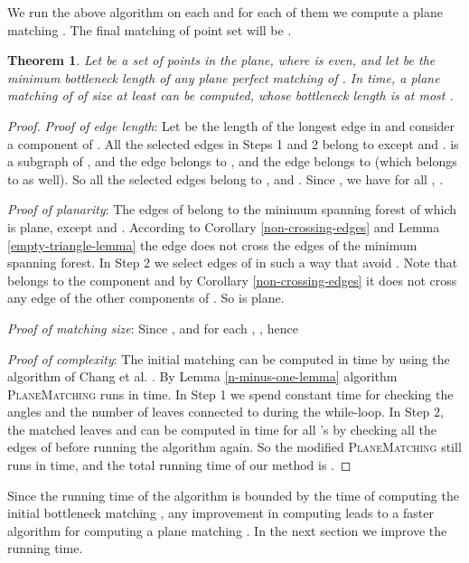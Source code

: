 \documentclass[11pt,a4paper]{article}
\newtheorem{theorem}{Theorem}
\begin{document}
We run the above algorithm on each  and for each of them we compute a plane matching . The final matching of point set  will be .

\begin{theorem}
\label{two-over-five-theorem}
Let  be a set of  points in the plane, where  is even, and let  be the minimum bottleneck length of any plane perfect matching of . In  time, a plane matching of  of size at least  can be computed, whose bottleneck length is at most .
\end{theorem}
\begin{proof}

{\em Proof of edge length}: Let  be the length of the longest edge in  and consider a component  of . All the selected edges in Steps 1 and 2 belong to  except  and .  is a subgraph of , and the edge  belongs to , and the edge  belongs to  (which belongs to  as well). So all the selected edges belong to , and . Since , we have  for all , .

 {\em Proof of planarity}: The edges of  belong to the minimum spanning forest of  which is plane, except  and . According to Corollary \ref{non-crossing-edges} and Lemma \ref{empty-triangle-lemma} the edge  does not cross the edges of the minimum spanning forest. In Step 2 we select edges of  in such a way that avoid . Note that  belongs to the component  and by Corollary \ref{non-crossing-edges} it does not cross any edge of the other components of . So  is plane.

 {\em Proof of matching size}: Since , and for each , , hence


 {\em Proof of complexity}: The initial matching  can be computed in time  by using the algorithm of Chang et al. \cite{Chang1992}. By Lemma \ref{n-minus-one-lemma} algorithm {\scshape PlaneMatching} runs in  time. In Step 1 we spend constant time for checking the angles and the number of leaves connected to  during the while-loop. In Step 2, the matched leaves  and  can be computed in  time for all 's by checking all the edges of  before running the algorithm again. So the modified {\scshape PlaneMatching} still runs in  time, and the total running time of our method is .
\end{proof}

Since the running time of the algorithm is bounded by the time of computing the initial bottleneck matching , any improvement in computing  leads to a faster algorithm for computing a plane matching  . In the next section we improve the running time.
\end{document}
